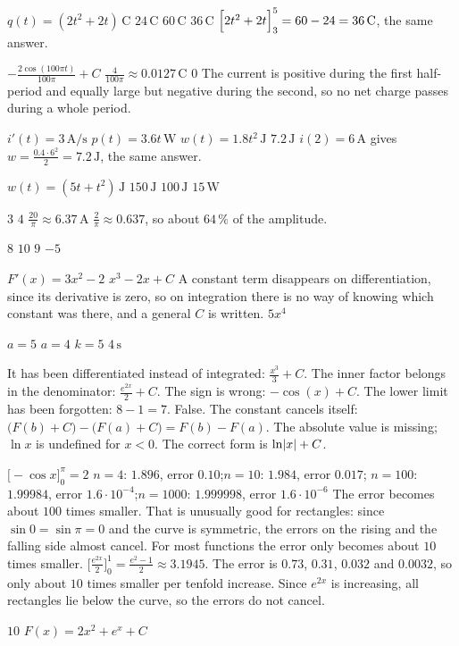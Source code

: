 \begin{facit}
  $q(t) = (2t^2 + 2t)\,\text{C}$  $24\,\text{C}$  $60\,\text{C}$
 $36\,\text{C}$  $\Bigl[2t^2 + 2t\Bigr]_3^5 = 60 - 24 = 36\,\text{C}$, the same answer.

  $-\frac{2\cos(100\pi t)}{100\pi} + C$
 $\frac{4}{100\pi} \approx 0.0127\,\text{C}$
 $0$
 The current is positive during the first half-period and equally large but negative during
the second, so no net charge passes during a whole period.

  $i'(t) = 3\,\text{A/s}$  $p(t) = 3.6t\,\text{W}$
 $w(t) = 1.8t^2\,\text{J}$  $7.2\,\text{J}$
 $i(2) = 6\,\text{A}$ gives $w = \frac{0.4 \cdot 6^2}{2} = 7.2\,\text{J}$, the same answer.

  $w(t) = (5t + t^2)\,\text{J}$  $150\,\text{J}$  $100\,\text{J}$
 $15\,\text{W}$

  $3$  $4$  $\frac{20}{\pi} \approx 6.37\,\text{A}$
 $\frac{2}{\pi} \approx 0.637$, so about $64\,\%$ of the amplitude.

  $8$  $10$  $9$  $-5$

  $F'(x) = 3x^2 - 2$  $x^3 - 2x + C$
 A constant term disappears on differentiation, since its derivative is zero, so on
integration there is no way of knowing which constant was there, and a general $C$ is written.
 $5x^4$

  $a = 5$  $a = 4$  $k = 5$  $4\,\text{s}$

  It has been differentiated instead of integrated: $\frac{x^3}{3} + C$.
 The inner factor belongs in the denominator: $\frac{e^{2x}}{2} + C$.
 The sign is wrong: $-\cos(x) + C$.
 The lower limit has been forgotten: $8 - 1 = 7$.
 False. The constant cancels itself: $\bigl(F(b) + C\bigr) - \bigl(F(a) + C\bigr) =
F(b) - F(a)$.
 The absolute value is missing; $\ln x$ is undefined for $x < 0$. The correct form is
$\ln\lvert x\rvert + C$.

  $\bigl[-\cos x\bigr]_0^{\pi} = 2$
 $n = 4$: $1.896$, error $0.10$;\enspace $n = 10$: $1.984$, error $0.017$;\enspace
$n = 100$: $1.99984$, error $1.6 \cdot 10^{-4}$;\enspace $n = 1000$: $1.999998$, error
$1.6 \cdot 10^{-6}$
 The error becomes about $100$ times smaller. That is unusually good for rectangles: since
$\sin 0 = \sin \pi = 0$ and the curve is symmetric, the errors on the rising and the falling side
almost cancel. For most functions the error only becomes about $10$ times smaller.
 $\bigl[\frac{e^{2x}}{2}\bigr]_0^{1} = \frac{e^2 - 1}{2} \approx 3.1945$. The error is $0.73$,
$0.31$, $0.032$ and $0.0032$, so only about $10$ times smaller per tenfold increase. Since $e^{2x}$
is increasing, all rectangles lie below the curve, so the errors do not cancel.

  $10$  $F(x) = 2x^2 + e^x + C$

\end{facit}
